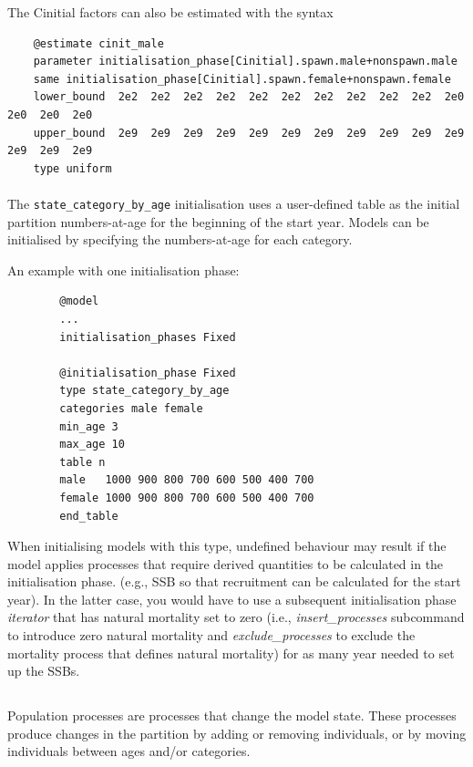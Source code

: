 The Cinitial factors can also be estimated with the syntax

{\small{\begin{verbatim}
	@estimate cinit_male
	parameter initialisation_phase[Cinitial].spawn.male+nonspawn.male
	same initialisation_phase[Cinitial].spawn.female+nonspawn.female
	lower_bound  2e2  2e2  2e2  2e2  2e2  2e2  2e2  2e2  2e2  2e2  2e0  2e0  2e0  2e0
	upper_bound  2e9  2e9  2e9  2e9  2e9  2e9  2e9  2e9  2e9  2e9  2e9  2e9  2e9  2e9
	type uniform
	\end{verbatim}}}

\paragraph{}

The \texttt{state\_category\_by\_age} initialisation uses a user-defined table as the initial partition numbers-at-age for the beginning of the  start year. Models can be initialised by specifying the numbers-at-age for each category. 

An example with one initialisation phase:

{\small{\begin{verbatim}
		@model
		...
		initialisation_phases Fixed

		@initialisation_phase Fixed
		type state_category_by_age
		categories male female
		min_age 3
		max_age 10
		table n
		male   1000 900 800 700 600 500 400 700
		female 1000 900 800 700 600 500 400 700
		end_table
		\end{verbatim}}}

When initialising models with this type, undefined behaviour may result if the model applies processes that require derived quantities to be calculated in the initialisation phase. (e.g., SSB so that recruitment can be calculated for the start year). In the latter case, you would have to use a subsequent initialisation phase \textit{iterator} that has natural mortality set to zero (i.e., \textit{insert\_processes} subcommand to introduce zero natural mortality and \textit{exclude\_processes} to exclude the mortality process that defines natural mortality) for as many year needed to set up the SSBs.


\subsection{}\label{sec:Population processes}

Population processes are processes that change the model state. These processes produce changes in the partition by adding or removing individuals, or by moving individuals between ages and/or categories.

